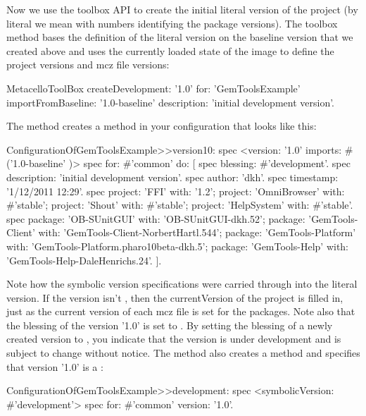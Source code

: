 \documentclass[a4paper,10pt,twoside]{book}
\begin{document}
Now we use the toolbox API to create the initial literal version of the project (by literal we mean with numbers identifying the package versions). The toolbox method  bases the definition of the literal version on the baseline version that we created above and uses the currently loaded state of the image to define the project versions and mcz file versions:

\begin{code}{}
  MetacelloToolBox
     createDevelopment: '1.0'
     for: 'GemToolsExample'
     importFromBaseline: '1.0-baseline'
     description: 'initial development version'.
\end{code}

The  method creates a  method in your configuration that looks like this:

\begin{code}{}
ConfigurationOfGemToolsExample>>version10: spec
  <version: '1.0' imports: #('1.0-baseline' )>
  spec for: #'common' do: [
     spec blessing: #'development'.
     spec description: 'initial development version'.
     spec author: 'dkh'.
     spec timestamp: '1/12/2011 12:29'.
     spec 
        project: 'FFI' with: '1.2';
        project: 'OmniBrowser' with: #'stable';
        project: 'Shout' with: #'stable';
        project: 'HelpSystem' with: #'stable'.
     spec
        package: 'OB-SUnitGUI' with: 'OB-SUnitGUI-dkh.52';
        package: 'GemTools-Client' with: 'GemTools-Client-NorbertHartl.544';
        package: 'GemTools-Platform' with: 'GemTools-Platform.pharo10beta-dkh.5';
        package: 'GemTools-Help' with: 'GemTools-Help-DaleHenrichs.24'. ].
\end{code}

Note how the  symbolic version specifications were carried through into the literal version. If the version isn't , then the currentVersion of the project is filled in, just as the current version of each mcz file is set for the packages. Note also that the blessing of the version '1.0' is set to . By setting the blessing of a newly created version to , you indicate that the version is under development and is subject to change without notice. The  method also creates a  method and specifies that version '1.0' is a :

\begin{code}{}
ConfigurationOfGemToolsExample>>development: spec
  <symbolicVersion: #'development'>
  spec for: #'common' version: '1.0'.
\end{code}
\end{document}
